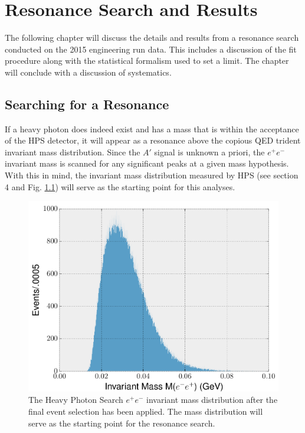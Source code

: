 
\chapter{Resonance Search and Results}

The following chapter will discuss the details and results from a resonance 
search conducted on the 2015 engineering run data.  This includes a discussion
of the fit procedure along with the statistical 
formalism used to set a limit.  The chapter will conclude with a discussion 
of systematics.

\section{Searching for a Resonance}

If a heavy photon does indeed exist and has a mass that is within the acceptance
of the HPS detector, it will appear as a resonance above the copious QED trident
invariant mass distribution.  Since the $A'$ signal is unknown a priori, the 
$e^+e^-$ invariant mass is scanned for any significant peaks at a given mass 
hypothesis.  With this in mind, the invariant mass distribution measured by
HPS (see section 4 and Fig. \ref{fig:mass_distribution}) will serve as the 
starting point for this analyses.
\begin{figure}[t]
    \centering
    \includegraphics[width=1.0\textwidth]{images/invariant_mass_final.png}
    \caption{The Heavy Photon Search $e^+e^-$ invariant mass distribution after
             the final event selection has been applied.  The mass distribution
             will serve as the starting point for the resonance search.}
    \label{fig:mass_distribution}
\end{figure}

